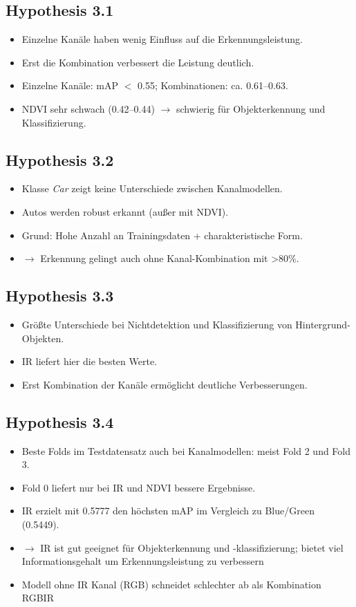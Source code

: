 \subsection*{Hypothesis 3.1}
\begin{itemize}
  \item Einzelne Kanäle haben wenig Einfluss auf die Erkennungsleistung.
  \item Erst die Kombination verbessert die Leistung deutlich.
  \item Einzelne Kanäle: mAP $<$ 0.55; Kombinationen: ca. 0.61--0.63.
  \item NDVI sehr schwach (0.42--0.44) $\rightarrow$ schwierig für Objekterkennung und Klassifizierung.
\end{itemize}

\subsection*{Hypothesis 3.2}
\begin{itemize}
  \item Klasse \emph{Car} zeigt keine Unterschiede zwischen Kanalmodellen.
  \item Autos werden robust erkannt (außer mit NDVI).
  \item Grund: Hohe Anzahl an Trainingsdaten + charakteristische Form.
  \item $\rightarrow$ Erkennung gelingt auch ohne Kanal-Kombination mit >80\%.
\end{itemize}

\subsection*{Hypothesis 3.3}
\begin{itemize}
  \item Größte Unterschiede bei Nichtdetektion und Klassifizierung von Hintergrund-Objekten.
  \item IR liefert hier die besten Werte.
  \item Erst Kombination der Kanäle ermöglicht deutliche Verbesserungen.
\end{itemize}

\subsection*{Hypothesis 3.4}
\begin{itemize}
  \item Beste Folds im Testdatensatz auch bei Kanalmodellen: meist Fold 2 und Fold 3.
  \item Fold 0 liefert nur bei IR und NDVI bessere Ergebnisse.
  \item IR erzielt mit 0.5777 den höchsten mAP im Vergleich zu Blue/Green (0.5449).
  \item $\rightarrow$ IR ist gut geeignet für Objekterkennung und -klassifizierung; bietet viel Informationsgehalt um Erkennungsleistung zu verbessern
  \item Modell ohne IR Kanal (RGB) schneidet schlechter ab als Kombination RGBIR 
\end{itemize}

